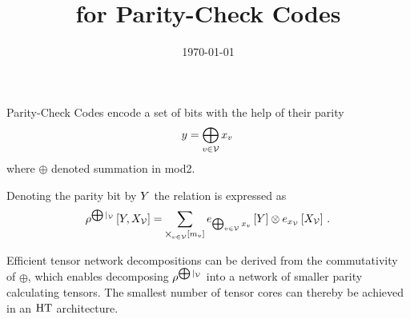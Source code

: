 \documentclass[aps,onecolumn,nofootinbib,pra]{article}
\begin{document}
    \title{\tnreason for Parity-Check Codes}

    \maketitle
    \date{\today}

    Parity-Check Codes encode a set of bits with the help of their parity
    \begin{align*}
        y = \bigoplus_{v\in\mathcal{V}} x_{v} \,
    \end{align*}
    where $\oplus$ denoted summation in mod2.

    Denoting the parity bit by $Y$ the relation is expressed as
    \begin{align*}
        \rho^{\bigoplus|_{\mathcal{V}}}\left[Y,X_{\mathcal{V}}\right]
        = \sum_{\bigtimes_{v\in\mathcal{V}}[m_{v}]} e_{\bigoplus_{v\in\mathcal{V}} x_{v}}\left[Y\right]
        \otimes e_{x_{\mathcal{V}}}\left[X_{\mathcal{V}}\right] \, .
    \end{align*}

    Efficient tensor network decompositions can be derived from the commutativity of $\oplus$, which enables decomposing $\rho^{\bigoplus|_{\mathcal{V}}}$ into a network of smaller parity calculating tensors.
    The smallest number of tensor cores can thereby be achieved in an $\mathrm{HT}$ architecture.
\end{document}
